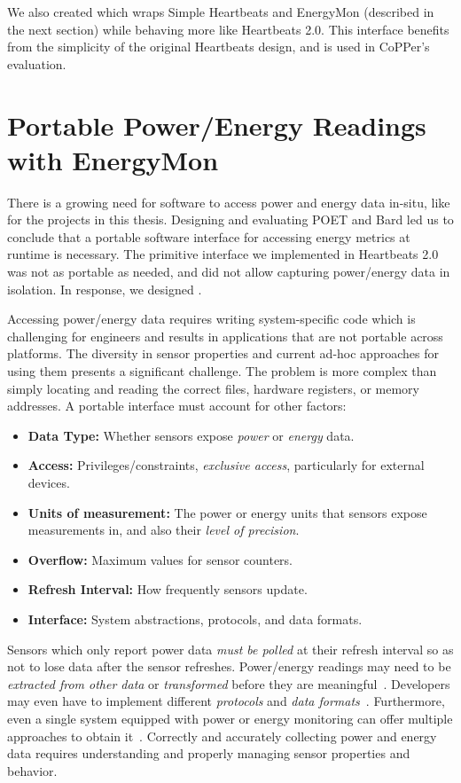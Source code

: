 We also created  which wraps Simple Heartbeats and EnergyMon (described in the next section) while behaving more like Heartbeats 2.0.
This interface benefits from the simplicity of the original Heartbeats design, and is used in CoPPer's evaluation.


\section{Portable Power/Energy Readings with EnergyMon}
\label{app:energymon}

There is a growing need for software to access power and energy data in-situ, like for the projects in this thesis.
Designing and evaluating POET and Bard led us to conclude that a portable software interface for accessing energy metrics at runtime is necessary.
The primitive interface we implemented in Heartbeats 2.0 was not as portable as needed, and did not allow capturing power/energy data in isolation.
In response, we designed .

Accessing power/energy data requires writing system-specific code which is challenging for engineers and results in applications that are not portable across platforms.
The diversity in sensor properties and current ad-hoc approaches for using them presents a significant challenge.
The problem is more complex than simply locating and reading the correct files, hardware registers, or memory addresses.
A portable interface must account for other factors:
\begin{itemize}
\item \textbf{Data Type:} Whether sensors expose \emph{power} or \emph{energy} data.
\item \textbf{Access:} Privileges/constraints, \eg \emph{exclusive access}, particularly for external devices.
\item \textbf{Units of measurement:} The power or energy units that sensors expose measurements in, and also their \emph{level of precision}.
\item \textbf{Overflow:} Maximum values for sensor counters.
\item \textbf{Refresh Interval:} How frequently sensors update.
\item \textbf{Interface:} System abstractions, protocols, and data formats.
\end{itemize}
Sensors which only report power data \emph{must be polled} at their refresh interval so as not to lose data after the sensor refreshes.
Power/energy readings may need to be \emph{extracted from other data} or \emph{transformed} before they are meaningful~\cite{WattsUp,OSP,SandyBridge}.
Developers may even have to implement different \emph{protocols} and \emph{data formats}~\cite{WattsUp,OSP}.
Furthermore, even a single system equipped with power or energy monitoring can offer multiple approaches to obtain it~\cite{RAPL,ina231,SandyBridge}.
Correctly and accurately collecting power and energy data requires understanding and properly managing sensor properties and behavior.

